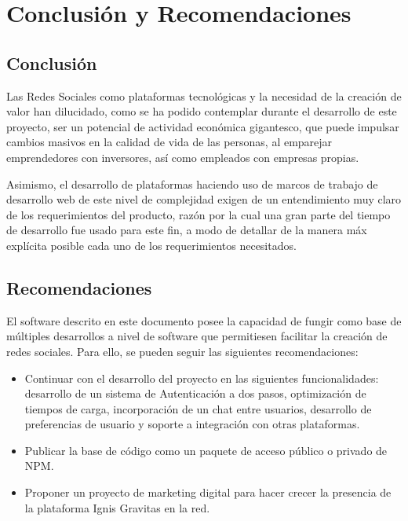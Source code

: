 \chapter{Conclusión y Recomendaciones}

\section{Conclusión}

Las Redes Sociales como plataformas tecnológicas y la necesidad de la creación de valor han dilucidado, como se ha podido contemplar durante el desarrollo de este proyecto, ser un potencial de actividad económica gigantesco, que puede impulsar cambios masivos en la calidad de vida de las personas, al emparejar emprendedores con inversores, así como empleados con empresas propias.

Asimismo, el desarrollo de plataformas haciendo uso de marcos de trabajo de desarrollo web de este nivel de complejidad exigen de un entendimiento muy claro de los requerimientos del producto, razón por la cual una gran parte del tiempo de desarrollo fue usado para este fin, a modo de detallar de la manera máx explícita posible cada uno de los requerimientos necesitados.

\section{Recomendaciones}

El software descrito en este documento posee la capacidad de fungir como base de múltiples desarrollos a nivel de software que permitiesen facilitar la creación de redes sociales. Para ello, se pueden seguir las siguientes recomendaciones:

\begin{itemize}
	\itemsep1pt \parskip1pt 
	\item Continuar con el desarrollo del proyecto en las siguientes funcionalidades: desarrollo de un sistema de Autenticación a dos pasos, optimización de tiempos de carga, incorporación de un chat entre usuarios, desarrollo de preferencias de usuario y soporte a integración con otras plataformas.

	\item Publicar la base de código como un paquete de acceso público o privado de NPM.

	\item Proponer un proyecto de marketing digital para hacer crecer la presencia de la plataforma Ignis Gravitas en la red.
\end{itemize}